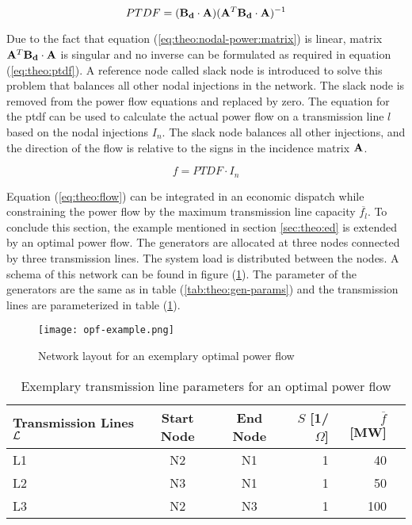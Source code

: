 \begin{equation}
	PTDF = (\vb{B_d} \cdot \vb{A})(\vb{A}^T \vb{B_d} \cdot \vb{A})^{-1} \label{eq:theo:ptdf}
\end{equation}

Due to the fact that equation (\ref{eq:theo:nodal-power:matrix}) is linear, matrix $\vb{A}^T \vb{B_d} \cdot \vb{A}$ is singular and no inverse can be formulated as required in equation (\ref{eq:theo:ptdf}). A reference node called slack node is introduced to solve this problem that balances all other nodal injections in the network. The slack node is removed from the power flow equations and replaced by zero. The equation for the \gls{ptdf} can be used to calculate the actual power flow on a transmission line $l$ based on the nodal injections $I_n$. The slack node balances all other injections, and the direction of the flow is relative to the signs in the incidence matrix $\vb{A}$.

\begin{equation}
	f = PTDF \cdot I_n \label{eq:theo:flow}
\end{equation}

Equation (\ref{eq:theo:flow}) can be integrated in an economic dispatch while constraining the power flow by the maximum transmission line capacity $\overline{f_l}$. To conclude this section, the example mentioned in section \ref{sec:theo:ed} is extended by an optimal power flow. The generators are allocated at three nodes connected by three transmission lines. The system load is distributed between the nodes. A schema of this network can be found in figure (\ref{fig:opf}). The parameter of the generators are the same as in table (\ref{tab:theo:gen-params}) and the transmission lines are parameterized in table (\ref{tab:theo:line-params}).

\begin{figure}[h]
	\centering
	\texttt{[image: opf-example.png]}
	\caption{Network layout for an exemplary optimal power flow}
	\label{fig:opf}
\end{figure}

\begin{table}[h!]
    \centering
    \begin{tabular}{lccrrc}
        Transmission Lines $\mathcal{L}$ & Start Node & End Node & $S$ [1/$\Omega$] & $\overline{f}$ [MW] \\ \toprule
        L1 & N2 & N1 & 1 & 40 \\
        L2 & N3 & N1 & 1 & 50 \\
        L3 & N2 & N3 & 1 & 100 \\
        \bottomrule
    \end{tabular}
    \caption{Exemplary transmission line parameters for an optimal power flow} \label{tab:theo:line-params}
\end{table}

